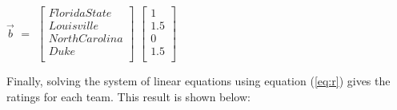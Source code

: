 \documentclass[12pt]{article}
\begin{document}
\begin{center}
$\vec{b}$ $=$
$\begin{bmatrix}
Florida State\\
Louisville\\
North Carolina\\
Duke\\
\end{bmatrix}$
$\begin{bmatrix}
1\\
1.5\\
0\\
1.5\\
\end{bmatrix}$
\end{center}

Finally, solving the system of linear equations using equation (\ref{eq:r}) gives the ratings for each team. This result is shown below:
\end{document}
